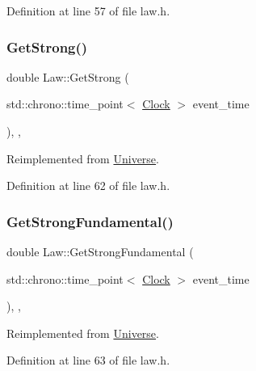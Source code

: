 Definition at line 57 of file law.\+h.

\mbox{\label{class_law_afd94bf09dbaf5d5df36b8f093db02dd9}} 
\subsubsection{\texorpdfstring{Get\+Strong()}{GetStrong()}}
{\footnotesize\ttfamily double Law\+::\+Get\+Strong (\begin{DoxyParamCaption}\item[{std\+::chrono\+::time\+\_\+point$<$ \hyperlink{universe_8h_a0ef8d951d1ca5ab3cfaf7ab4c7a6fd80}{Clock} $>$}]{event\+\_\+time }\end{DoxyParamCaption})\hspace{0.3cm}{\ttfamily [inline]}, {\ttfamily [final]}, {\ttfamily [virtual]}}



Reimplemented from \hyperlink{class_universe_acb453ce71da418c5b5617fecede9571b}{Universe}.



Definition at line 62 of file law.\+h.

\mbox{\label{class_law_afcdbea76524e5a52691fff7b526971e9}} 
\subsubsection{\texorpdfstring{Get\+Strong\+Fundamental()}{GetStrongFundamental()}}
{\footnotesize\ttfamily double Law\+::\+Get\+Strong\+Fundamental (\begin{DoxyParamCaption}\item[{std\+::chrono\+::time\+\_\+point$<$ \hyperlink{universe_8h_a0ef8d951d1ca5ab3cfaf7ab4c7a6fd80}{Clock} $>$}]{event\+\_\+time }\end{DoxyParamCaption})\hspace{0.3cm}{\ttfamily [inline]}, {\ttfamily [final]}, {\ttfamily [virtual]}}



Reimplemented from \hyperlink{class_universe_ab44daccba01ee7e3cf9b50bba83dd19e}{Universe}.



Definition at line 63 of file law.\+h.

